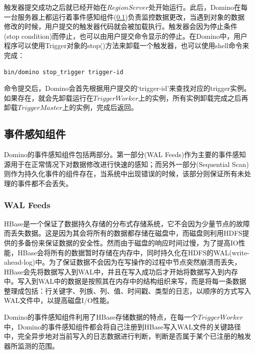 触发器提交成功之后就已经开始在$RegionServer$处开始运行。此后，Domino在每一台服务器上都运行着事件感知组件(\ref{subsection:feed})负责监控数据更改，当遇到对象的数据修改的时候，用户提交的触发器代码就会被加载执行。触发器会因为停止条件(stop condition)而停止，也可以由用户提交命令显示的停止。在Domino中，用户程序可以使用Trigger对象的stop()方法来卸载一个触发器，也可以使用shell命令来完成：
\begin{lstlisting}[language=bash]
	bin/domino stop_trigger trigger-id
\end{lstlisting}
命令提交后，Domino会首先根据用户提交的‘trigger-id’来查找对应的trigger实例。如果存在，就会先卸载运行在$TriggerWorker$上的实例，所有实例卸载完成之后再卸载$TriggerMaster$上的实例，完成后返回。

\subsection{事件感知组件}
\label{subsection:feed}
Domino的事件感知组件包括两部分。第一部分(WAL Feeds)作为主要的事件感知源用于在正常情况下对数据修改进行快速的感知；而另外一部分(Sequential Scan)则作为持久化事件的组件存在，当系统中出现错误的时候，该部分则保证所有未处理的事件都不会丢失。

\subsubsection{WAL Feeds}

HBase是一个保证了数据持久存储的分布式存储系统，它不会因为少量节点的故障而丢失数据。这是因为其会将所有的数据都存储在磁盘中，而磁盘则利用HDFS提供的多备份来保证数据的安全性。然而由于磁盘的响应时间过慢，为了提高IO性能，HBase会将所有的数据暂时存储在内存中，同时持久化在HDFS的WAL(write-ahead-log)中。为了保证数据不会因为在写操作的过程中节点突然崩溃而丢失，HBase会先将数据写入到WAL中，并且在写入成功后才开始将数据写入到内存中。写入到WAL中的数据是按照其在内存中的结构组织来写，而是将每一条数据整理成包括：行关键字、列族、列、值、时间戳、类型的日志，以顺序的方式写入WAL文件中，以提高磁盘I/O性能。

Domino的事件感知组件利用了HBase存储数据的特点，在每一个$TriggerWorker$中，Domino的事件感知组件都会将自己注册到HBase写入WAL文件的关键路径中，完全异步地对当前写入的日志数据进行判断，判断是否属于某个已注册的触发器所监测的范围。


